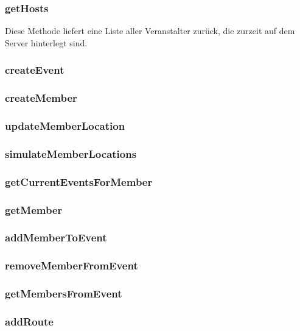 \subsubsection*{getHosts}
Diese Methode liefert eine Liste aller Veranstalter zurück, die zurzeit auf dem Server hinterlegt sind.

\subsubsection*{createEvent}


\subsubsection*{createMember}


\subsubsection*{updateMemberLocation}


\subsubsection*{simulateMemberLocations}


\subsubsection*{getCurrentEventsForMember}


\subsubsection*{getMember}


\subsubsection*{addMemberToEvent}


\subsubsection*{removeMemberFromEvent}


\subsubsection*{getMembersFromEvent}


\subsubsection*{addRoute}


